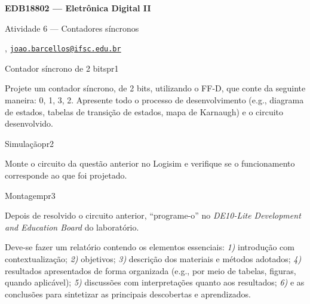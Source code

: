 



\usepackage[style=numeric, citestyle=ieee]{biblatex}




\begin{Large}
    \textbf{EDB18802 --- Eletrônica Digital II}
    
    Atividade 6 --- Contadores síncronos \hfill {}
\end{Large}

\vspace{1ex}
\textbf{} , \href{mailto:joao.barcellos@ifsc.edu.br}{\texttt{joao.barcellos@ifsc.edu.br}}\\
\textbf{}

\vspace{2ex}

\begin{problem}{Contador síncrono de 2 bits}{pr1}

Projete um contador síncrono, de 2 bits, utilizando o FF-D, que conte da seguinte maneira: 0, 1, 3, 2. Apresente todo o processo de desenvolvimento (e.g., diagrama de estados, tabelas de transição de estados, mapa de Karnaugh) e o circuito desenvolvido.

\end{problem}

\begin{problem}{Simulação}{pr2}

Monte o circuito da questão anterior no Logisim e verifique se o funcionamento corresponde ao que foi projetado. \\

\end{problem}

\begin{problem}{Montagem}{pr3}
    
Depois de resolvido o circuito anterior, ``programe-o'' no \textit{DE10-Lite Development and Education Board} do laboratório. 

\end{problem}

\begin{obs}

Deve-se fazer um relatório contendo os elementos essenciais: \textit{1)} introdução com contextualização; \textit{2)} objetivos; \textit{3)} descrição dos materiais e métodos adotados; \textit{4)} resultados apresentados de forma organizada (e.g., por meio de tabelas, figuras, quando aplicável); \textit{5)} discussões com interpretações quanto aos resultados; \textit{6)} e as conclusões para sintetizar as principais descobertas e aprendizados.

\end{obs}

\newpage

\printbibliography



